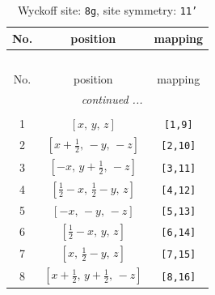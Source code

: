 \documentclass[fleqn,8pt]{jsarticle}
\begin{document}
\renewcommand{\arraystretch}{1.2}
\begin{longtable}{ccc}
\caption{Wyckoff site: {\tt 8g}, site symmetry: {\tt 11'}}
 \\
 \hline \hline
No. & position & mapping \\ \hline \endfirsthead

\multicolumn{2}{l}{\tablename\ \thetable{}} \\
 \hline \hline
No. & position & mapping \\ \hline \endhead

 \hline \hline
\multicolumn{2}{r}{\footnotesize\it continued ...} \\ \endfoot

 \hline \hline
\multicolumn{2}{r}{} \\ \endlastfoot

1 & $\left[ x,\, y,\, z \right]$ & {\tt [1,9]} \\ \hline
2 & $\left[ x + \frac{1}{2},\, - y,\, - z \right]$ & {\tt [2,10]} \\ \hline
3 & $\left[ - x,\, y + \frac{1}{2},\, - z \right]$ & {\tt [3,11]} \\ \hline
4 & $\left[ \frac{1}{2} - x,\, \frac{1}{2} - y,\, z \right]$ & {\tt [4,12]} \\ \hline
5 & $\left[ - x,\, - y,\, - z \right]$ & {\tt [5,13]} \\ \hline
6 & $\left[ \frac{1}{2} - x,\, y,\, z \right]$ & {\tt [6,14]} \\ \hline
7 & $\left[ x,\, \frac{1}{2} - y,\, z \right]$ & {\tt [7,15]} \\ \hline
8 & $\left[ x + \frac{1}{2},\, y + \frac{1}{2},\, - z \right]$ & {\tt [8,16]} \\
\end{longtable}
\end{document}
